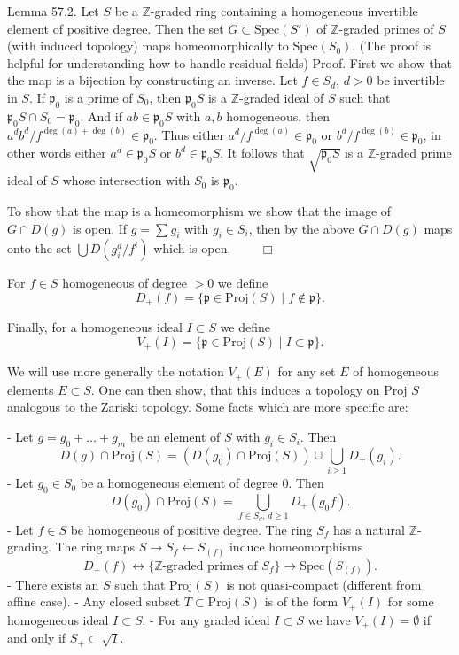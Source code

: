 Lemma 57.2. Let \(S\) be a \(\mathbb{Z}\)-graded ring containing a homogeneous invertible element of positive degree. 
Then the set \(G \subset \mathrm{Spec}(S')\) of \(\mathbb{Z}\)-graded primes of \(S\) (with induced topology) maps homeomorphically 
to \(\mathrm{Spec}(S_0)\). (The proof is helpful for understanding how to handle residual fields)
Proof. First we show that the map is a bijection by constructing an inverse. 
Let \(f \in S_d\), \(d > 0\) be invertible in \(S\). If \(\mathfrak{p}_0\) is a prime of \(S_0\), then \(\mathfrak{p}_0 S\) is a \(\mathbb{Z}\)-graded ideal of \(S\) such that \(\mathfrak{p}_0 S \cap S_0 = \mathfrak{p}_0\). And if \(ab \in \mathfrak{p}_0 S\) with \(a, b\) homogeneous, then \(a^d b^d / f^{\deg(a) + \deg(b)} \in \mathfrak{p}_0\). Thus either \(a^d / f^{\deg(a)} \in \mathfrak{p}_0\) or \(b^d / f^{\deg(b)} \in \mathfrak{p}_0\), in other words either \(a^d \in \mathfrak{p}_0 S\) or \(b^d \in \mathfrak{p}_0 S\). It follows that \(\sqrt{\mathfrak{p}_0 S}\) is a \(\mathbb{Z}\)-graded prime ideal of \(S\) whose intersection with \(S_0\) is \(\mathfrak{p}_0\).

To show that the map is a homeomorphism we show that the image of \(G \cap D(g)\) is open. If \(g = \sum g_i\) with \(g_i \in S_i\), 
then by the above \(G \cap D(g)\) maps onto the set \(\bigcup D(g_i^d / f^{i})\) which is open. \(\qquad \Box\)

For \(f \in S\) homogeneous of degree \(> 0\) we define
\[
D_+(f) = \{ \mathfrak{p} \in \mathrm{Proj}(S) \mid f \notin \mathfrak{p} \}.
\]

Finally, for a homogeneous ideal \(I \subset S\) we define
\[
V_+(I) = \{ \mathfrak{p} \in \mathrm{Proj}(S) \mid I \subset \mathfrak{p} \}.
\]

We will use more generally the notation \(V_+(E)\) for any set \(E\) of homogeneous elements \(E \subset S\).
One can then show, that this induces a topology on \( \text{Proj } S \) analogous to the Zariski topology.
Some facts which are more specific are:

- Let \(g = g_0 + \ldots + g_m\) be an element of \(S\) with \(g_i \in S_i\). Then
\[
D(g) \cap \mathrm{Proj}(S) = (D(g_0) \cap \mathrm{Proj}(S)) \cup \bigcup_{i \geq 1} D_+(g_i).
\]
- Let \(g_0 \in S_0\) be a homogeneous element of degree 0. Then
\[
D(g_0) \cap \mathrm{Proj}(S) = \bigcup_{f \in S_d,\, d \geq 1} D_+(g_0 f).
\]
- Let \(f \in S\) be homogeneous of positive degree. The ring \(S_f\) has a natural \(\mathbb{Z}\)-grading. 
  The ring maps \(S \to S_f \gets S_{(f)}\) induce homeomorphisms
\[
D_+(f) \leftrightarrow \{\mathbb{Z}\text{-graded primes of } S_f\} \to \mathrm{Spec}(S_{(f)}).
\]
- There exists an \(S\) such that \(\mathrm{Proj}(S)\) is not quasi-compact (different from affine case).
- Any closed subset \(T \subset \mathrm{Proj}(S)\) is of the form \(V_+(I)\) for some homogeneous ideal \(I \subset S\).
- For any graded ideal \(I \subset S\) we have \(V_+(I) = \emptyset\) if and only if \(S_+ \subset \sqrt{I}\).



